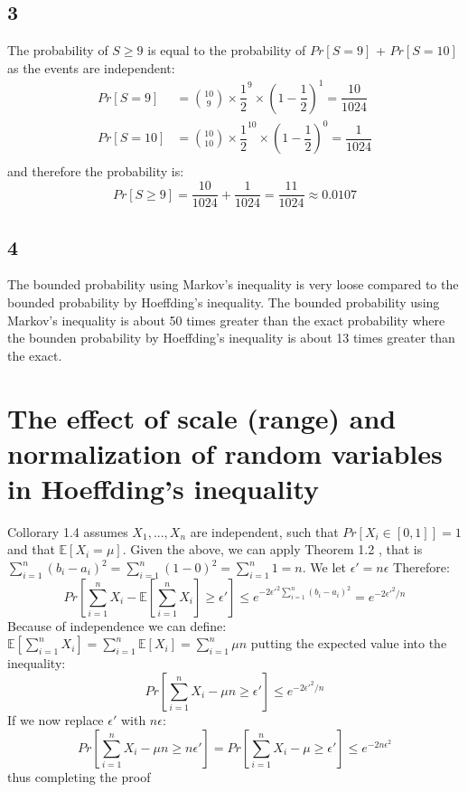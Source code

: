 \documentclass{article}
\begin{document}
\subsection{3}
The probability of $S \geq 9$ is equal to the probability of $Pr[S=9]$ + $Pr[S=10]$ as the events are independent:
\begin{align*}
Pr[S=9] &= \binom{10}{9} \times \dfrac{1}{2}^9 \times \left( 1 - \dfrac{1}{2} \right)^1 = \dfrac{10}{1024} \\
Pr[S=10] &= \binom{10}{10} \times \dfrac{1}{2}^{10} \times \left( 1 - \dfrac{1}{2} \right)^0 = \dfrac{1}{1024} \\
\end{align*}
and therefore the probability is:
\begin{equation*}
Pr[S\geq 9] = \frac{10}{1024} + \frac{1}{1024} = \frac{11}{1024} \approx 0.0107
\end{equation*}
\subsection{4}
The bounded probability using Markov's inequality is very loose compared to the bounded probability by Hoeffding's inequality. The bounded probability using Markov's inequality is about 50 times greater than the exact probability where the bounden probability by Hoeffding's inequality is about 13 times greater than the exact.
\section{The effect of scale (range) and normalization of random variables in Hoeffding's inequality}
Collorary 1.4 assumes $ X_1,...,X_n$ are independent, such that $Pr[X_i \in [0,1]] = 1$ and that $\mathbb{E}[X_i=\mu]$. Given the above, we can apply Theorem 1.2 , that is $\sum_{i=1}^n (b_i-a_i)^2 = \sum_{i=1}^n (1-0)^2 =
\sum_{i=1}^n 1 = n $. We let $\epsilon' = n\epsilon$
Therefore:
\begin{equation*}
Pr \left[ \sum\limits^n_{i=1} X_i-\mathbb{E} \left[\sum\limits^n_{i=1} X_i \right] \geq \epsilon'\right] \leq e^{ -2 \epsilon'^2 \sum_{i=1}^n(b_i-a_i)^2  }= e^{-2\epsilon'^2/n}
\end{equation*}
Because of independence we can define:
$\mathbb{E}[\sum_{i = 1}^{n}X_i]= \sum_{i = 1}^{n}\mathbb{E}[X_i] = \sum_{i = 1}^{n} \mu n $ putting the expected value into the inequality:
\begin{equation*}
Pr \left[ \sum\limits^n_{i=1} X_i - \mu n  \geq \epsilon' \right] \leq e^{-2\epsilon'^2/n}
\end{equation*}
If we now replace $\epsilon'$ with $n\epsilon$:
\begin{equation*}
Pr \left[ \sum\limits^n_{i=1} X_i - \mu n  \geq n\epsilon' \right] =
Pr \left[ \sum\limits^n_{i=1} X_i - \mu  \geq \epsilon' \right] 
 \leq e^{-2 n \epsilon^2}
\end{equation*}
thus completing the proof
\end{document}
